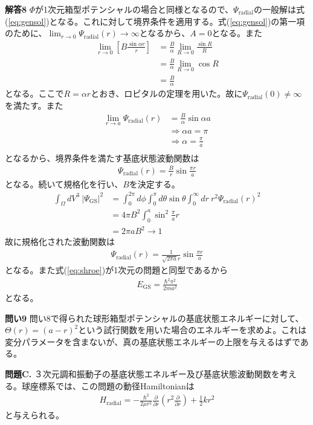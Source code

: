 \documentclass[11pt,pra,aps]{revtex4}
\begin{document}
\noindent
{\bf 解答8}
$\Phi$が1次元箱型ポテンシャルの場合と同様となるので、$\Psi_\text{radial}$の一般解は式(\ref{eq:gensol})となる。これに対して境界条件を適用する。式(\ref{eq:gensol})の第一項のために、$\lim_{r\rightarrow0}\Psi_\text{radial}(r)\rightarrow\infty$となるから、$A=0$となる。また
\begin{align}
  \lim_{r\rightarrow0}\left[B\frac{\sin\alpha r}{r}\right]&=\frac{B}{\alpha}\lim_{R\rightarrow0}\frac{\sin R}{R} \nonumber \\
  &=\frac{B}{\alpha}\lim_{R\rightarrow0}\cos R \nonumber \\
  &=\frac{B}{\alpha}
\end{align}
となる。ここで$R=\alpha r$とおき、ロピタルの定理を用いた。故に$\Psi_\text{radial}(0)\neq\infty$を満たす。また
\begin{align}
  \lim_{r\rightarrow a}\Psi_\text{radial}(r)&=\frac{B}{\alpha}\sin\alpha a \\
  &\Rightarrow \alpha a = \pi \\
  &\Rightarrow \alpha = \frac{\pi}{a} \\
\end{align}
となるから、境界条件を満たす基底状態波動関数は
\begin{align}
  \Psi_\text{radial}(r)=\frac{B}{r}\sin\frac{\pi r}{a}
\end{align}
となる。続いて規格化を行い、$B$を決定する。
\begin{align}
  \int_\Omega dV^3 \ |\Psi_\text{GS}|^{2}&=\int^{2\pi}_0d\phi\int^{\pi}_0d\theta\sin\theta\int_0^\infty dr \ r^2 \Psi_\text{radial}(r)^2 \nonumber \\
  &=4\pi B^2 \int^a_0 \sin^2\frac{\pi}{a} r \nonumber \\
  &=2\pi aB^2\rightarrow 1
\end{align}
故に規格化された波動関数は
\begin{align}
  \Psi_\text{radial}(r)=\frac{1}{\sqrt{2\pi a}r}\sin\frac{\pi r}{a}
\end{align}
となる。また式(\ref{eq:shroe})が1次元の問題と同型であるから
\begin{align}
  E_\text{GS}=\frac{\hbar^2\pi^2}{2ma^2}
\end{align}
となる。

\noindent
{\bf 問い9} 問い8で得られた球形箱型ポテンシャルの基底状態エネルギーに対して、$\Theta(r)=(a-r)^2$という試行関数を用いた場合のエネルギーを求めよ。これは変分パラメータを含まないが、真の基底状態エネルギーの上限を与えるはずである。

\noindent
{\bf 問題C.} ３次元調和振動子の基底状態エネルギー及び基底状態波動関数を考える。球座標系では、この問題の動径Hamiltonianは
\begin{align}
  H_\text{radial}=-\frac{\hbar^2}{2\mu r^2}\frac{\partial}{\partial r}\left(r^2 \frac{\partial}{\partial r}\right) + \frac{1}{2}kr^2\label{eq:3dp}
\end{align}    
と与えられる。
\end{document}
